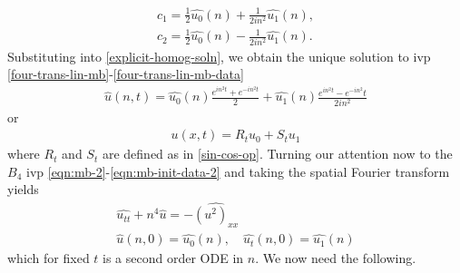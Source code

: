 \documentclass[12pt,reqno]{amsart}
\numberwithin{equation}{section}  %
\numberwithin{figure}{section}
\newcommand{\wh}{\widehat}
\theoremstyle{plain}
\theoremstyle{definition}
\theoremstyle{remark}
\begin{document}
%
%
\begin{gather*}
  c_{1} = \frac{1}{2} \wh{u_{0}}(n) + \frac{1}{2in^{2}}\wh{u_{1}}(n),
  \\
  c_{2} = \frac{1}{2} \wh{u_{0}}(n) - \frac{1}{2in^{2}}\wh{u_{1}}(n).
\end{gather*}
%
%
Substituting into \eqref{explicit-homog-soln}, we obtain the unique solution to
ivp \eqref{four-trans-lin-mb}-\eqref{four-trans-lin-mb-data}
%
%
\begin{equation*}
\begin{split}
  \wh{u}(n, t) = \wh{u_{0}}(n) \frac{e^{in^{2}t} + e^{-in^{2}t}}{2} +
  \wh{u_{1}}(n)\frac{e^{in^{2}t} - e^{-in^{2}}t}{2 i n^{2}}
\end{split}
\end{equation*}
%
or
%
%
\begin{equation*}
\begin{split}
  u(x,t) = R_{t}u_{0} + S_{t}u_{1}
\end{split}
\end{equation*}
%
%
where $R_{t}$ and $S_{t}$ are defined as in \eqref{sin-cos-op}.
Turning our attention now to the $B_{4}$ ivp
\eqref{eqn:mb-2}-\eqref{eqn:mb-init-data-2} and taking the spatial Fourier
transform yields 
%
%
\begin{gather}
  \wh{u_{tt}} + n^{4} \wh{u} = -\wh{(u^{2})_{xx}}
  \label{four-trans-mb}
  \\
  \wh{u}(n, 0) = \wh{u_{0}}(n), \quad \wh{u_{t}}(n, 0) = \wh{u_{1}}(n)
  \label{four-trans-mb-data}
\end{gather}
which for fixed $t$ is a second order ODE in $n$. 
We now need the following.
%
%
%
%
%
%
%
%
\end{document}
